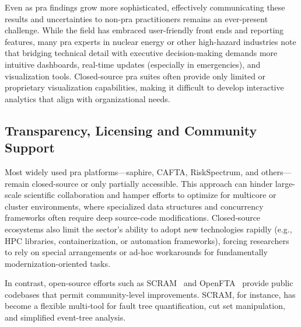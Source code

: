 Even as \acrshort{pra} findings grow more sophisticated, effectively communicating these results and uncertainties to non-\acrshort{pra} practitioners remains an ever-present challenge. While the field has embraced user-friendly front ends and reporting features, many \acrshort{pra} experts in nuclear energy or other high-hazard industries note that bridging technical detail with executive decision-making demands more intuitive dashboards, real-time updates (especially in emergencies), and visualization tools. Closed-source \acrshort{pra} suites often provide only limited or proprietary visualization capabilities, making it difficult to develop interactive analytics that align with organizational needs.

\subsection{Transparency, Licensing and Community Support}

Most widely used \acrshort{pra} platforms—\acrshort{saphire}, CAFTA, RiskSpectrum, and others—remain closed-source or only partially accessible. This approach can hinder large-scale scientific collaboration and hamper efforts to optimize for multicore or cluster environments, where specialized data structures and concurrency frameworks often require deep source-code modifications. Closed‐source ecosystems also limit the sector’s ability to adopt new technologies rapidly (e.g., HPC libraries, containerization, or automation frameworks), forcing researchers to rely on special arrangements or ad-hoc workarounds for fundamentally modernization-oriented tasks.

In contrast, open-source efforts such as SCRAM~\cite{scram} and OpenFTA~\cite{opensource_fta_tools} provide public codebases that permit community-level improvements. SCRAM, for instance, has become a flexible multi-tool for fault tree quantification, cut set manipulation, and simplified event-tree analysis.

